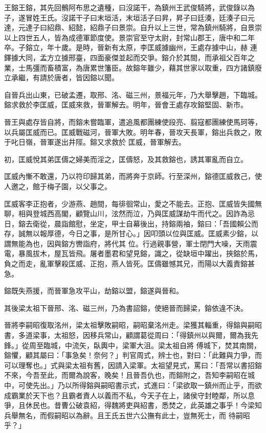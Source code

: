 
\begin{pinyinscope}

 王鎔王鎔，其先回鶻阿布思之遺種，曰沒諾干，為鎮州王武俊騎將，武俊錄以為子，遂冒姓王氏。沒諾干子曰末垣活，末垣活子曰昇，昇子曰廷湊，廷湊子曰元達，元達子曰紹鼎、紹懿，紹鼎子曰景崇。自升以上三世，常為鎮州騎將，自景崇以上四世五人，皆為成德軍節度使。景崇官至守太尉，封常山郡王，唐中和二年卒。子鎔立，年十歲。是時，晉新有太原，李匡威據幽州，王處存據中山，赫
 連鐸據大同，孟方立據邢臺，四面豪傑並起而交爭。鎔介於其間，而承祖父百年之業，士馬彊而畜積富，為唐累世籓臣。故鎔年雖少，藉其世家以取重，四方諸鎮廢立承繼，有請於唐者，皆因鎔以聞。



 自晉兵出山東，已破孟遷，取邢、洺、磁三州，景福元年，乃大舉擊趙，下臨城。鎔求救於李匡威，匡威來救，晉軍解去。明年，晉會王處存攻鎔堅固、新市。



 晉王與處存皆自將，而鎔未嘗臨軍，遣追風都團練使段亮、翦寇都團練使馬珂等，以兵屬匡威而已。匡威戰磁河，晉軍大敗。明年春，晉攻天長軍，鎔出兵救之，敗于叱日嶺，晉軍遂出井陘。鎔又求救於
 匡威，晉軍解去。



 初，匡威悅其弟匡儔之婦美而淫之，匡儔怒，及其救鎔也，誘其軍亂而自立。



 匡威內慚不敢還，乃以符印歸其弟，而將奔于京師。行至深州，鎔德匡威救己，使人邀之，館于梅子園，以父事之。



 匡威客李正抱者，少游燕、趙間，每徘徊常山，愛之不能去。正抱、匡威皆失國無聊，相與登城西高閣，顧覽山川，泫然而泣，乃與匡威謀劫牛而代之。因詐為忌日，鎔去衛從，晨詣館慰，坐定，甲士自幕後出，持鎔兩袖，鎔曰：「吾國賴公而存，誠無以報厚德，今日之事，是所甘心。」因叩頭以位與匡威。匡威素少鎔，以謂無能為也，因與鎔方轡詣府，將代其
 位。行過親事營，軍士閉門大噪，天雨震電，暴風拔木，屋瓦皆飛。屠者墨君和望見鎔，識之，從缺垣中躍出，挾鎔於馬，負之而走，亂軍擊殺匡威、正抱，燕人皆死。匡儔雖憾其兄，而陽以大義責鎔甚急。



 鎔既失燕援，而晉軍急攻平山，劫鎔以盟，鎔遂與晉和。



 其後梁太祖下晉邢、洺、磁三州，乃為書詔鎔，使絕晉而歸梁，鎔依違不決。



 晉將李嗣昭復取洺州，梁太祖擊敗嗣昭，嗣昭棄洺州走。梁獲其輜重，得鎔與嗣昭書，多道梁事，太祖怒，因移兵常山，顧謂葛從周曰：「得鎮州以與爾，爾為我先鋒。」從周至臨城，中流矢，臥輿中，梁軍大沮。梁太祖自將
 傅城下，焚其南關，鎔懼，顧其屬曰：「事急矣！奈何？」判官周式，辨士也，對曰：「此難與力爭，而可以理奪也。」式與梁太祖有舊，因請入梁軍。太祖望見式，罵曰：「吾常以書招鎔不來，今吾至此，而爾為說客，晚矣！且晉吾仇也，而鎔附之，吾知李嗣昭在城中，可使先出。」乃以所得鎔與嗣昭書示式，式進曰：「梁欲取一鎮州而止乎，而欲成霸業於天下也？且霸者責人以義而不私，今天子在上，諸侯守封睦鄰，所以息爭，且休民也。昔曹公破袁紹，得魏將吏與紹書，悉焚之，此英雄之事乎！今梁知兵舉無名，而假嗣昭以為辭。且王氏五世六公撫有此士，豈無死士，而
 待嗣昭乎？」




\end{pinyinscope}
